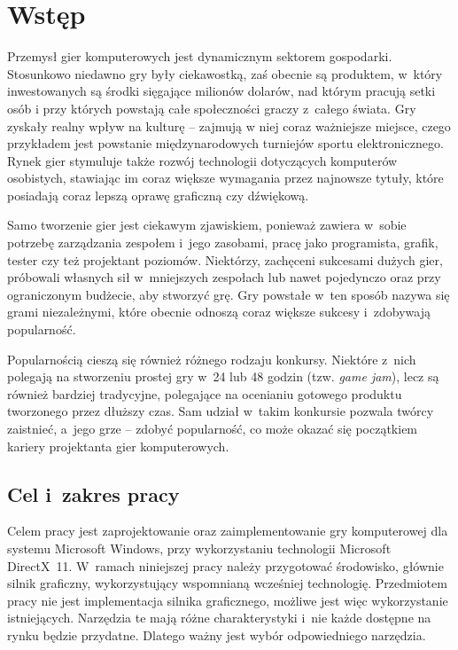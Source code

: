 
\chapter{Wst\k{e}p}

Przemysł gier komputerowych jest dynamicznym sektorem gospodarki. Stosunkowo niedawno gry były ciekawostką, zaś obecnie są produktem, w~który inwestowanych są środki sięgające milionów dolarów, nad którym pracują setki osób i przy których powstają całe społeczności graczy z~całego świata. Gry zyskały realny wpływ na kulturę -- zajmują w niej coraz ważniejsze miejsce, czego przykładem jest powstanie międzynarodowych turniejów sportu elektronicznego. Rynek gier stymuluje także rozwój technologii dotyczących komputerów osobistych, stawiając im coraz większe wymagania przez najnowsze tytuły, które posiadają coraz lepszą oprawę graficzną czy dźwiękową.

Samo tworzenie gier jest ciekawym zjawiskiem, ponieważ zawiera w~sobie potrzebę zarządzania zespołem i~jego zasobami, pracę jako programista, grafik, tester czy też projektant poziomów. Niektórzy, zachęceni sukcesami dużych gier, próbowali własnych sił w~mniejszych zespołach lub nawet pojedynczo oraz przy ograniczonym budżecie, aby stworzyć grę.
Gry powstałe w~ten sposób nazywa się grami niezależnymi, które obecnie odnoszą coraz większe sukcesy i~zdobywają popularność.

Popularnością cieszą się również różnego rodzaju konkursy. Niektóre z~nich polegają na stworzeniu prostej gry w~24 lub 48 godzin (tzw. \emph{game jam}), lecz są również bardziej tradycyjne, polegające na ocenianiu gotowego produktu tworzonego przez dłuższy czas. Sam udział w~takim konkursie pozwala twórcy zaistnieć, a~jego grze -- zdobyć popularność, co może okazać się początkiem kariery projektanta gier komputerowych.



\section{Cel i~zakres pracy}

Celem pracy jest zaprojektowanie oraz zaimplementowanie gry komputerowej dla systemu Microsoft Windows, przy wykorzystaniu technologii Microsoft DirectX~11. W~ramach niniejszej pracy należy przygotować środowisko, głównie silnik graficzny, wykorzystujący wspomnianą wcześniej technologię. Przedmiotem pracy nie jest implementacja silnika graficznego, możliwe jest więc wykorzystanie istniejących. Narzędzia te mają różne charakterystyki i~nie każde dostępne na rynku będzie przydatne. Dlatego ważny jest wybór odpowiedniego narzędzia. 

